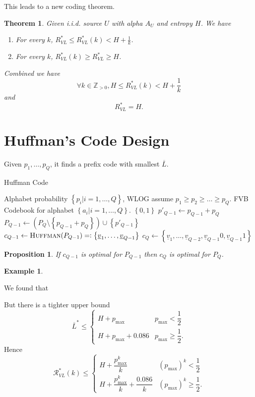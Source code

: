 \documentclass{report}
\newcommand{\Z}{\mathbb{Z}}
\newcommand{\set}[1]{\left\lbrace #1 \right\rbrace}
\newcommand{\eqdef}{=\mathrel{\mathop:}}
\newtheorem{theorem}{Theorem}[section]
\newtheorem{proposition}{Proposition}[section]
\theoremstyle{definition}
\newtheorem{example}{Example}[section]
\theoremstyle{remark}
\numberwithin{equation}{section}
\begin{document}
This leads to a new coding theorem.
\begin{theorem}
  Given i.i.d. source $U$ with alpha $A_U$ and entropy $H$. We have \begin{enumerate}
    \item For every $k$, $R_{VL}^* \leq R_{VL}^*(k) < H + \frac{1}{k}$.
    \item For every $k$, $R_{VL}^*(k) \geq R_{VL}^* \geq H$.
  \end{enumerate}
  Combined we have \[
    \forall k \in \Z_{>0}, H \leq R_{VL}^*(k) < H + \frac{1}{k}
  \] and \[
    R_{VL}^* = H.  
  \]
\end{theorem}

\section{Huffman's Code Design}
Given $p_1, \ldots, p_Q$, it finds a prefix code with smallest $\overline{L}$.
\begin{algorithm}[h]
  \caption{Huffman Code}
  \label{algo:huffman}
  \begin{algorithmic}[1] 
    \Require Alphabet probability $\set{p_i | i = 1, \ldots, Q}$, WLOG assume $p_1 \geq p_2 \geq \ldots \geq p_Q$.
    \Ensure FVB Codebook for alphabet $\set{a_i | i = 1, \ldots, Q}$.
    \Function{Huffman}{$P_Q = \set{p_i | i = 1, \ldots, Q}$}
        \Return $\set{0, 1}$
      \EndIf
      \State $p'_{Q-1} \gets p_{Q-1} + p_Q$
      \State $P_{Q-1} \gets \left(P_Q \setminus \set{p_{Q-1} + p_Q}\right) \cup \set{p'_{Q-1}}$
      \State $c_{Q-1} \gets \textsc{Huffman}(P_{Q-1}) \eqdef \set{\underline{v}_1, \ldots, \underline{v}_{Q-1}}$
      \State $c_Q \gets \set{\underline{v}_1, \ldots, \underline{v}_{Q-2}, \underline{v}_{Q-1}0, \underline{v}_{Q-1}1}$
    \EndFunction
  \end{algorithmic}
\end{algorithm}

\begin{proposition}
  If $c_{Q-1}$ is optimal for $P_{Q-1}$ then $c_Q$ is optimal for $P_Q$.
\end{proposition}

\begin{example}
  
\end{example}

We found that \[\]

But there is a tighter upper bound \[
  \overline{L}^* \leq \begin{cases}
    H + p_{\max} & p_{\max} < \dfrac{1}{2} \\[0.8em]
    H + p_{\max} + 0.086 & p_{\max} \geq \dfrac{1}{2}.
  \end{cases}  
\]
Hence
\[
  \mathscr{R}_{VL}^*(k) \leq \begin{cases}
    H + \dfrac{p_{\max}^k}{k} & (p_{\max})^k < \dfrac{1}{2} \\[0.8em]
    H + \dfrac{p_{\max}^k}{k} + \dfrac{0.086}{k} & (p_{\max})^k \geq \dfrac{1}{2}.
  \end{cases}
\]
\end{document}
